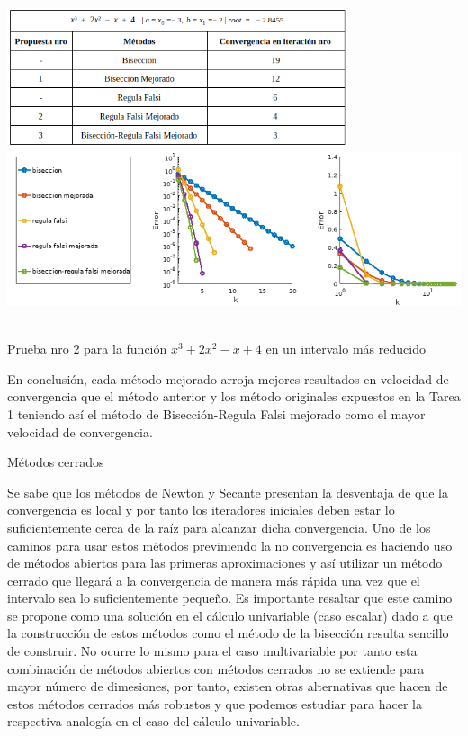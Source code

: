 \documentclass[11pt]{article}
\begin{document}
\begin{center}
    \includegraphics[keepaspectratio, width=10cm]{C3.png}
    \vspace{0.5cm}
    \includegraphics[keepaspectratio, width=14cm]{G3.png}
     \caption \tiny{\\ Prueba nro 2 para la función $x^3 + 2x^2 - x + 4$ en un intervalo más reducido}
\end{center} 

En conclusión, cada método mejorado arroja mejores resultados en velocidad de convergencia que el método anterior y los método originales expuestos en la Tarea 1 teniendo así el método de Bisección-Regula Falsi mejorado como el mayor velocidad de convergencia.

\vspace{0.75cm}


\begin{center} \large {Métodos cerrados} \end{center}


Se sabe que los métodos de Newton y Secante presentan la desventaja de que la convergencia es local y por tanto los iteradores iniciales deben estar lo suficientemente cerca de la raíz para alcanzar dicha convergencia. Uno de los caminos para usar estos métodos previniendo la no convergencia es haciendo uso de métodos abiertos para las primeras aproximaciones y así utilizar un método cerrado que llegará a la convergencia de manera más rápida una vez que el intervalo sea lo suficientemente pequeño. Es importante resaltar que este camino se propone como una solución en el cálculo univariable (caso escalar) dado a que la construcción de estos métodos como el método de la bisección resulta sencillo de construir. No ocurre lo mismo para el caso multivariable por tanto esta combinación de métodos abiertos con métodos cerrados no se extiende para mayor número de dimesiones, por tanto, existen otras alternativas que hacen de estos métodos cerrados más robustos y que podemos estudiar para hacer la respectiva analogía en el caso del cálculo univariable.
\end{document}
